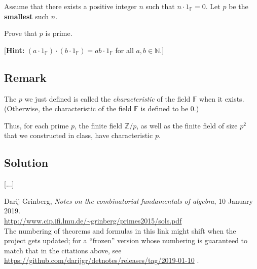 \documentclass[paper=a4, fontsize=12pt]{scrartcl} %
\newcommand{\NN}{\mathbb{N}} %
\newcommand{\FF}{\mathbb{F}} %
\newcommand{\ZZ}{\mathbb{Z}} %
\newcommand{\tup}[1]{\left( #1 \right)}
\theoremstyle{plainsl}
\theoremstyle{definition}
\theoremstyle{remark}
\begin{document}
Assume that there exists a positive integer $n$ such that
$n \cdot 1_{\FF} = 0$.
Let $p$ be the \textbf{smallest} such $n$.

Prove that $p$ is prime.

[\textbf{Hint:}
$\tup{a \cdot 1_{\FF}} \cdot \tup{b \cdot 1_{\FF}}
= ab \cdot 1_{\FF}$
for all $a, b \in \NN$.]

\subsection{Remark}

The $p$ we just defined is called the \textit{characteristic} of the field
$\FF$ when it exists. (Otherwise, the characteristic of the field
$\FF$ is defined to be $0$.)

Thus, for each prime $p$, the finite field $\ZZ / p$, as well as the
finite field of size $p^2$ that we constructed in class,
have characteristic $p$.

\subsection{Solution}

[...]

\begin{thebibliography}{99999999}                                                                                         %





Darij Grinberg,
\textit{Notes on the combinatorial fundamentals of algebra},
10 January 2019. \\
\url{http://www.cip.ifi.lmu.de/~grinberg/primes2015/sols.pdf}
\\
The numbering of theorems and formulas in this link might shift
when the project gets updated; for a ``frozen'' version whose
numbering is guaranteed to match that in the citations above, see
\url{https://github.com/darijgr/detnotes/releases/tag/2019-01-10} .

\end{thebibliography}
\end{document}

